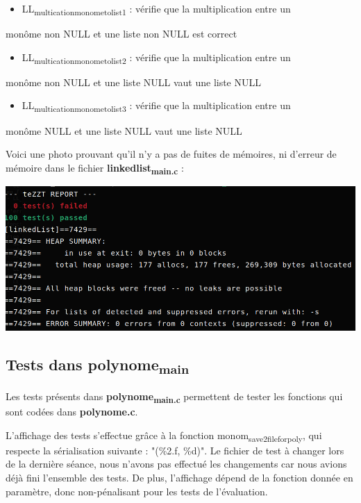 \documentclass[11pt]{article}
\begin{document}
\begin{itemize}
\item LL\textsubscript{multication}\textsubscript{monome}\textsubscript{to}\textsubscript{list1} : vérifie que la multiplication entre un
\end{itemize}
monôme non NULL et une liste non NULL est correct
\begin{itemize}
\item LL\textsubscript{multication}\textsubscript{monome}\textsubscript{to}\textsubscript{list2} : vérifie que la multiplication entre un
\end{itemize}
monôme non NULL et une liste NULL vaut une liste NULL
\begin{itemize}
\item LL\textsubscript{multication}\textsubscript{monome}\textsubscript{to}\textsubscript{list3} : vérifie que la multiplication entre un
\end{itemize}
monôme NULL et une liste NULL vaut une liste NULL


Voici une photo prouvant qu'il n'y a pas de fuites de mémoires, ni d'erreur de
mémoire dans le fichier \textbf{linkedlist\textsubscript{main.c}} :
 \begin{center}
\includegraphics[width=.9\linewidth]{img/test_valgrind_linkedlist.png}
\end{center}

\subsection{Tests dans polynome\textsubscript{main}}
\label{sec:org45e626f}
Les tests présents dans \textbf{polynome\textsubscript{main.c}} permettent de tester les fonctions qui
sont codées dans \textbf{polynome.c}.

L'affichage des tests s'effectue grâce à la fonction monom\textsubscript{save2fileforpoly}, qui
respecte la sérialisation suivante : "(\%2.f, \%d)". Le fichier de test à changer
lors de la dernière séance, nous n'avons pas effectué les changements car nous
avions déjà fini l'ensemble des tests. De plus, l'affichage dépend de la fonction
donnée en paramètre, donc non-pénalisant pour les tests de l'évaluation.
\end{document}
